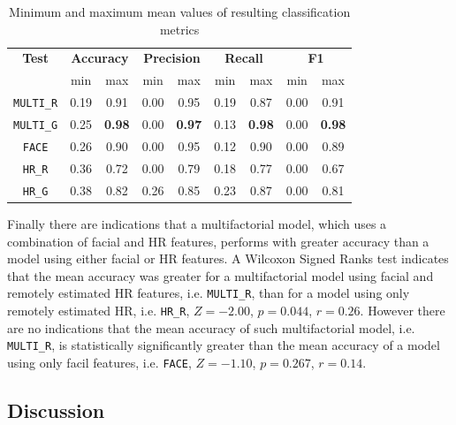 \begin{table}[!htbp]
  \centering
  \caption{Minimum and maximum mean values of resulting classification metrics}
  \label{table:study5-result-metrics-minmax}
  \begin{tabular}{ccccccccc}
    \hline
      \textbf{Test} & \multicolumn{2}{c}{\textbf{Accuracy}} & \multicolumn{2}{c}{\textbf{Precision}} & \multicolumn{2}{c}{\textbf{Recall}} & \multicolumn{2}{c}{\textbf{F1}} \\
      {} & min & max & min & max & min & max & min & max \\
    \hline
      \texttt{MULTI\_R}  & 0.19 & 0.91 & 0.00 & 0.95 & 0.19 & 0.87 & 0.00 & 0.91 \\ %
      \texttt{MULTI\_G}  & 0.25 & \textbf{0.98} & 0.00 & \textbf{0.97} & 0.13 & \textbf{0.98} & 0.00 & \textbf{0.98} \\ %
      \texttt{FACE}  & 0.26 & 0.90 & 0.00 & 0.95 & 0.12 & 0.90 & 0.00 & 0.89 \\ %
      \texttt{HR\_R}  & 0.36 & 0.72 & 0.00 & 0.79 & 0.18 & 0.77 & 0.00 & 0.67 \\ %
      \texttt{HR\_G}  & 0.38 & 0.82 & 0.26 & 0.85 & 0.23 & 0.87 & 0.00 & 0.81 \\ %
    \hline
  \end{tabular}
\end{table}


Finally there are indications that a multifactorial model, which uses a combination of facial and HR features, performs with greater accuracy than a model using either facial or HR features. A Wilcoxon Signed Ranks test indicates that the mean accuracy was greater for a multifactorial model using facial and remotely estimated HR features, i.e. \texttt{MULTI\_R}, than for a model using only remotely estimated HR, i.e. \texttt{HR\_R}, $Z=-2.00$, $p=0.044$, $r=0.26$. However there are no indications that the mean accuracy of such multifactorial model, i.e. \texttt{MULTI\_R}, is statistically significantly greater than the mean accuracy of a model using only facil features, i.e. \texttt{FACE}, $Z=-1.10$, $p=0.267$, $r=0.14$.

\subsection{Discussion}

